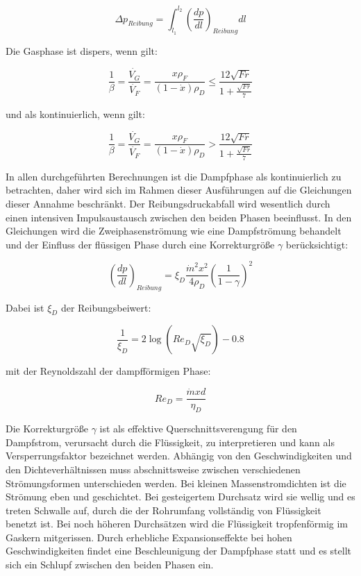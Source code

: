 \begin{equation}
\label{eq:11}
\Delta p_{Reibung} = \int_{l_1}^{l_2} \left( \frac{dp}{dl} \right)_{Reibung} dl
\end{equation}


Die Gasphase ist dispers, wenn gilt:

\begin{equation}
\label{eq:12}
\frac{1}{\beta} = \frac{\dot{V_G}}{\dot{V_F}} = \frac{x\rho_F}{(1-\dot{x})\rho_D} \leq \frac{12\sqrt{Fr}}{1+\frac{\sqrt{Fr}}{7}}
\end{equation}

und als kontinuierlich, wenn gilt:

\begin{equation}
\label{eq:13}
\frac{1}{\beta} = \frac{\dot{V_G}}{\dot{V_F}} = \frac{x\rho_F}{(1-\dot{x})\rho_D} > \frac{12\sqrt{Fr}}{1+\frac{\sqrt{Fr}}{7}}
\end{equation}

In allen durchgeführten Berechnungen ist die Dampfphase als kontinuierlich zu betrachten, daher wird sich im Rahmen dieser Ausführungen auf die Gleichungen dieser Annahme beschränkt. Der Reibungsdruckabfall wird wesentlich durch einen intensiven Impulsaustausch zwischen den beiden Phasen beeinflusst. In den Gleichungen wird die Zweiphasenströmung wie eine Dampfströmung behandelt und der Einfluss der flüssigen Phase durch eine Korrekturgröße $\gamma$ berücksichtigt:

\begin{equation}
\label{eq:14}
\left( \frac{dp}{dl} \right)_{Reibung} = \xi_D \frac{\dot{m}^2 x^2}{4\rho_D} \left(\frac{1}{1-\gamma} \right)^2
\end{equation}

Dabei ist $\xi_D$ der Reibungsbeiwert:

\begin{equation}
\label{eq:15}
\frac{1}{\xi_D} = 2\log(Re_D \sqrt{\xi_D})-0.8
\end{equation}

mit der Reynoldszahl der dampfförmigen Phase:

\begin{equation}
\label{eq:16}
Re_D = \frac{\dot{m} x d}{\eta_D}
\end{equation}

Die Korrekturgröße $\gamma$ ist als effektive Querschnittsverengung für den Dampfstrom, verursacht durch die Flüssigkeit, zu interpretieren und kann als Versperrungsfaktor bezeichnet werden. Abhängig von den Geschwindigkeiten und den Dichteverhältnissen muss abschnittsweise zwischen verschiedenen Strömungsformen unterschieden werden. Bei kleinen Massenstromdichten ist die Strömung eben und geschichtet. Bei gesteigertem Durchsatz wird sie wellig und es treten Schwalle auf, durch die der Rohrumfang vollständig von Flüssigkeit benetzt ist. Bei noch höheren Durchsätzen wird die Flüssigkeit tropfenförmig im Gaskern mitgerissen. Durch erhebliche Expansionseffekte bei hohen Geschwindigkeiten findet eine Beschleunigung der Dampfphase statt und es stellt sich ein Schlupf zwischen den beiden Phasen ein\cite{Kesper.1976}.

